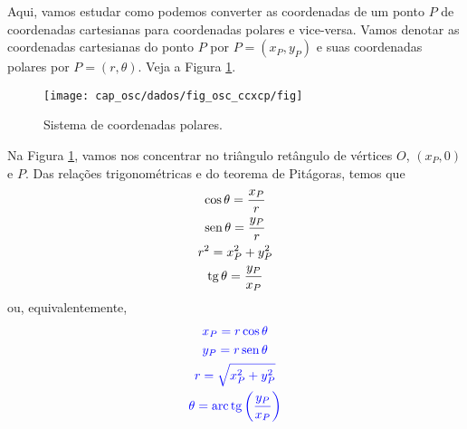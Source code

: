 Aqui, vamos estudar como podemos converter as coordenadas de um ponto $P$ de coordenadas cartesianas para coordenadas polares e vice-versa. Vamos denotar as coordenadas cartesianas do ponto $P$ por $P=(x_P, y_P)$ e suas coordenadas polares por $P=(r, \theta)$. Veja a Figura \ref{fig:osc_ccxcp}.

\begin{figure}[H]
  \centering
  \texttt{[image: cap\_osc/dados/fig\_osc\_ccxcp/fig]}
  \caption{Sistema de coordenadas polares.}
  \label{fig:osc_ccxcp}
\end{figure}  

Na Figura \ref{fig:osc_ccxcp}, vamos nos concentrar no triângulo retângulo de vértices $O$, $(x_P, 0)$ e $P$. Das relações trigonométricas e do teorema de Pitágoras, temos que
\begin{gather}
  \cos\theta = \frac{x_P}{r} \\
  \operatorname{sen}\theta = \frac{y_P}{r} \\
  r^2 = x_P^2 + y_P^2 \\
  \operatorname{tg}\theta = \frac{y_P}{x_P}
\end{gather}
ou, equivalentemente,
\begin{gather}
  {\color{blue}x_P = r\cos\theta} \\
  {\color{blue}y_P = r\operatorname{sen}\theta} \\
  {\color{blue}r = \sqrt{x_P^2 + y_P^2 }} \\
  {\color{blue}\theta = \operatorname{arc}\operatorname{tg}\left(\frac{y_P}{x_P}\right)}
\end{gather}

